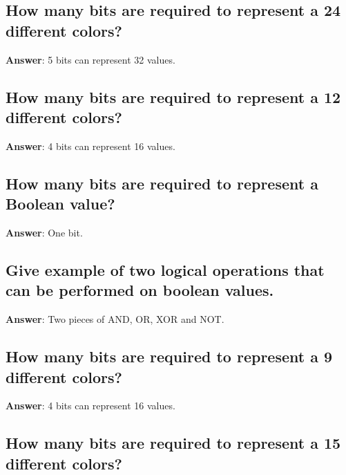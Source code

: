\documentclass[a4paper,11pt,oneside]{article}
\begin{document}
\begin{sloppypar}
\subsection{How many bits are required to represent a 24 different colors?}

\label{q:85:sa:en:True}

\textbf{Answer}: 5 bits can represent 32 values.



\subsection{How many bits are required to represent a 12 different colors?}

\label{q:86:sa:en:True}

\textbf{Answer}: 4 bits can represent 16 values.



\subsection{How many bits are required to represent a Boolean value?}

\label{q:87:sa:en:True}

\textbf{Answer}: One bit.



\subsection{Give example of two logical operations that can be performed on boolean values.}

\label{q:88:sa:en:True}

\textbf{Answer}: Two pieces of AND, OR, XOR and NOT.



\subsection{How many bits are required to represent a 9 different colors?}

\label{q:89:sa:en:True}

\textbf{Answer}: 4 bits can represent 16 values.



\subsection{How many bits are required to represent a 15 different colors?}


\end{sloppypar}
\end{document}
